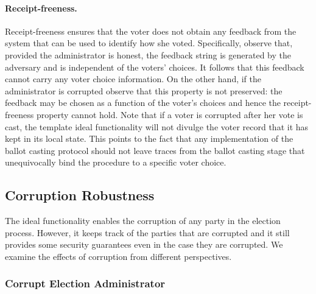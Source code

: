 \paragraph{Receipt-freeness.} Receipt-freeness ensures that the voter
does not obtain any feedback from the system that can be used to
identify how she voted. Specifically, observe that, provided the
administrator is honest, the feedback string is generated by the
adversary and is independent of the voters' choices. It follows that
this feedback cannot carry any voter choice information. On the other
hand, if the administrator is corrupted observe that this property is
not preserved: the feedback may be chosen as a function of the voter's
choices and hence the receipt-freeness property cannot hold. Note that
if a voter is corrupted after her vote is cast, the template ideal
functionality will not divulge the voter record that it has kept in
its local state. This points to the fact that any implementation of
the ballot casting protocol should not leave traces from the ballot
casting stage that unequivocally bind the procedure to a specific
voter choice.

\subsection{Corruption Robustness}

The ideal functionality enables the corruption of any party in the
election process. However, it keeps track of the parties that are
corrupted and it still provides some security guarantees even in the
case they are corrupted. We examine the effects of corruption from
different perspectives.

\subsubsection{Corrupt Election Administrator}

